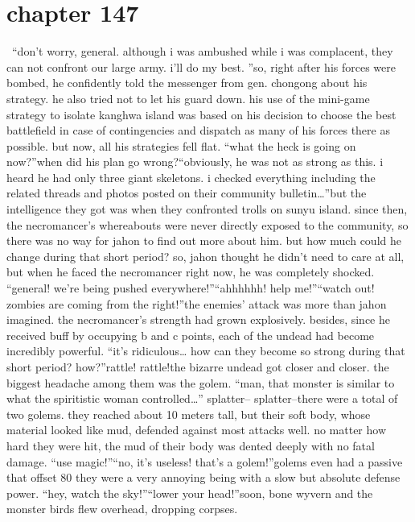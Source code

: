 \section{chapter 147}






 “don’t worry, general.
 although i was ambushed while i was complacent, they can not confront our large army.
 i’ll do my best.
”so, right after his forces were bombed, he confidently told the messenger from gen.
 chongong about his strategy.
he also tried not to let his guard down.
 his use of the mini-game strategy to isolate kanghwa island was based on his decision to choose the best battlefield in case of contingencies and dispatch as many of his forces there as possible.
but now, all his strategies fell flat.
“what the heck is going on now?”when did his plan go wrong?“obviously, he was not as strong as this.
 i heard he had only three giant skeletons.
 i checked everything including the related threads and photos posted on their community bulletin…”but the intelligence they got was when they confronted trolls on sunyu island.
 since then, the necromancer’s whereabouts were never directly exposed to the community, so there was no way for jahon to find out more about him.
but how much could he change during that short period? so, jahon thought he didn’t need to care at all, but when he faced the necromancer right now, he was completely shocked.
“general! we’re being pushed everywhere!”“ahhhhhh! help me!”“watch out! zombies are coming from the right!”the enemies’ attack was more than jahon imagined.
the necromancer’s strength had grown explosively.
 besides, since he received buff by occupying b and c points, each of the undead had become incredibly powerful.
“it’s ridiculous… how can they become so strong during that short period? how?”rattle! rattle!the bizarre undead got closer and closer.
 the biggest headache among them was the golem.
“man, that monster is similar to what the spiritistic woman controlled…”
splatter– splatter–there were a total of two golems.
 they reached about 10 meters tall, but their soft body, whose material looked like mud, defended against most attacks well.
 no matter how hard they were hit, the mud of their body was dented deeply with no fatal damage.
“use magic!”“no, it’s useless! that’s a golem!”golems even had a passive that offset 80%
 they were a very annoying being with a slow but absolute defense power.
“hey, watch the sky!”“lower your head!”soon, bone wyvern and the monster birds flew overhead, dropping corpses.
